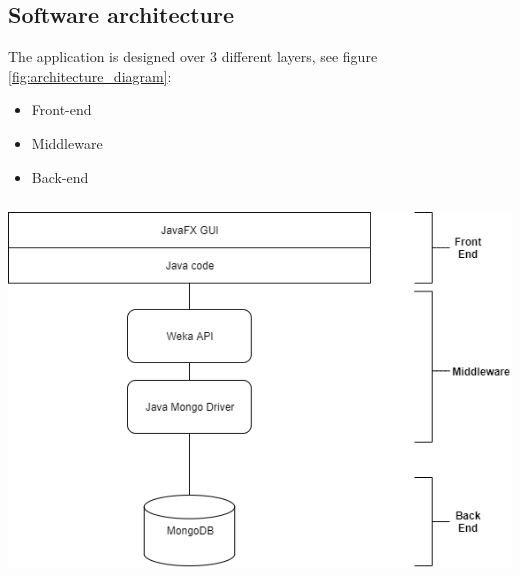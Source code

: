 \documentclass[a4paper, oneside]{article}
\begin{document}
\subsection{Software architecture}
The application is designed over 3 different layers, see figure \ref{fig:architecture_diagram}:
\begin{itemize}
\item Front-end
\item Middleware
\item Back-end
\end{itemize}
\vspace{5mm}
\begin{minipage}{\linewidth}
\begin{center}
\vspace{1mm}
\includegraphics[height = 100mm]{./images/diagrams/architecture} 
\vspace{6mm}
\label{fig:architecture_diagram}
\end{center}
\end{minipage}
\vspace{7mm}
\clearpage
\end{document}
